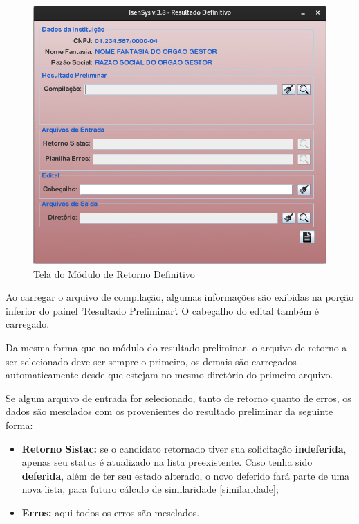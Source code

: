 \documentclass[
	12pt,			%
	openright,		%
	oneside,	
	a4paper,		%
	english,		%
	brazil			%
]{abntex2/abntex2}  %
\begin{document}
					\begin{figure}[H]
						\begin{center}
							
							\caption{Tela do Módulo de Retorno Definitivo}
							\label{retorno-def-ui}
							
							\includegraphics[scale=0.6]{img/retorno-def-ui}
							
						\end{center}
					\end{figure}
	
					Ao carregar o arquivo de compilação, algumas informações são exibidas na porção inferior do painel 'Resultado Preliminar'. O cabeçalho do edital também é carregado.
	
					Da mesma forma que no módulo do resultado preliminar, o arquivo de retorno a ser selecionado deve ser sempre o primeiro, os demais são carregados automaticamente desde que estejam no mesmo diretório do primeiro arquivo.
	
					Se algum arquivo de entrada for selecionado, tanto de retorno quanto de erros, os dados são mesclados com os provenientes do resultado preliminar da seguinte forma:
	
					\begin{itemize}
						
						\item \textbf{Retorno Sistac:} se o candidato retornado tiver sua solicitação \textbf{indeferida}, apenas seu status é atualizado na lista preexistente. Caso tenha sido \textbf{deferida}, além de ter seu estado alterado, o novo deferido fará parte de uma nova lista, para futuro cálculo de similaridade \ref{similaridade};
						
						\item \textbf{Erros:} aqui todos os erros são mesclados.
						
					\end{itemize}
	
\end{document}
